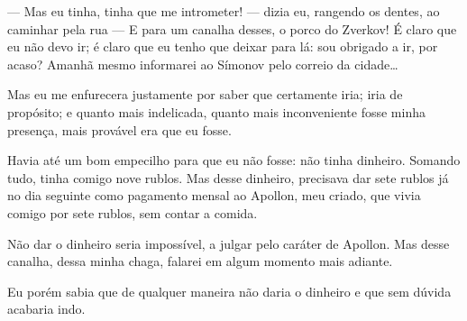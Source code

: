 --- Mas eu tinha, tinha que me intrometer! --- dizia eu, rangendo os dentes,
ao caminhar pela rua --- E para um canalha desses, o porco do Zverkov! É
claro que eu não devo ir; é claro que eu tenho que deixar para lá: sou
obrigado a ir, por acaso? Amanhã mesmo informarei ao Símonov pelo
correio da cidade\ldots{}

Mas eu me enfurecera justamente por saber que certamente iria; iria de
propósito; e quanto mais indelicada, quanto mais inconveniente fosse
minha presença, mais provável era que eu fosse.

Havia até um bom empecilho para que eu não fosse: não tinha dinheiro.
Somando tudo, tinha comigo nove rublos. Mas desse dinheiro, precisava
dar sete rublos já no dia seguinte como pagamento mensal ao Apollon,
meu criado, que vivia comigo por sete rublos, sem contar a comida.

Não dar o dinheiro seria impossível, a julgar pelo caráter de Apollon.
Mas desse canalha, dessa minha chaga, falarei em algum momento mais
adiante.

Eu porém sabia que de qualquer maneira não daria o dinheiro e que sem
dúvida acabaria indo.

